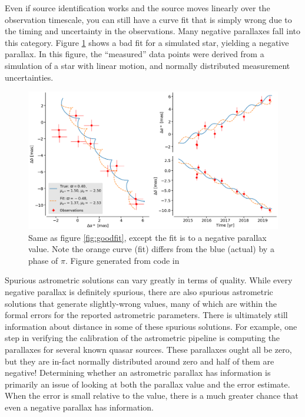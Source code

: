 \documentclass[preprint2]{aastex631}
\begin{document}
Even if source identification works and the source moves linearly over the observation timescale, you can still have a curve fit that is simply wrong due to the timing and uncertainty in the observations. Many negative parallaxes fall into this category. Figure \ref{fig:badfit} shows a bad fit for a simulated star, yielding a negative parallax. In this figure, the ``measured'' data points were derived from a simulation of a star with linear motion, and normally distributed measurement uncertainties.

\begin{figure}
	\includegraphics[width=\columnwidth]{astrometric-bad.png}
	\caption{Same as figure \ref{fig:goodfit}, except the fit is to a negative parallax value. Note the orange curve (fit) differs from the blue (actual) by a phase of $\pi$. Figure generated from code in \cite{luriGaia2018}}
	\label{fig:badfit}
\end{figure}



Spurious astrometric solutions can vary greatly in terms of quality. While every negative parallax is definitely spurious, there are also spurious astrometric solutions that generate slightly-wrong values, many of which are within the formal errors for the reported astrometric parameters. There is ultimately still information about distance in some of these spurious solutions. For example, one step in verifying the calibration of the astrometric pipeline is computing the parallaxes for several known quasar sources\citep{luriGaia2018}. These parallaxes ought all be zero, but they are in-fact normally distributed around zero and half of them are negative! Determining whether an astrometric parallax has information is primarily an issue of looking at both the parallax value and the error estimate. When the error is small relative to the value, there is a much greater chance that even a negative parallax has information.
\end{document}
